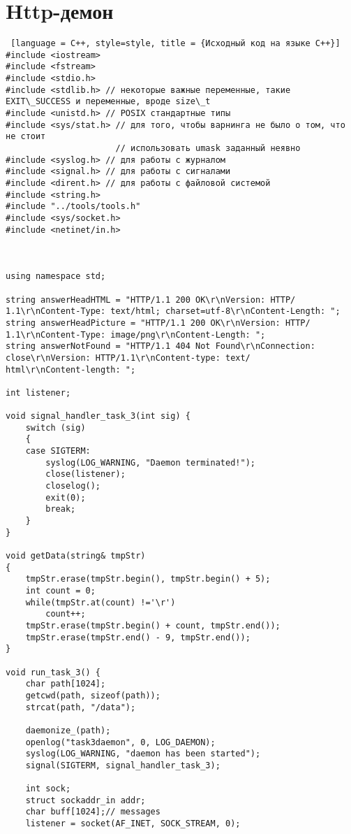 \documentclass{article}
\begin{document}
	\section{Http-демон}

	\begin{lstlisting} [language = C++, style=style, title = {Исходный код на языке C++}]
#include <iostream>
#include <fstream>
#include <stdio.h>
#include <stdlib.h> // некоторые важные переменные, такие EXIT\_SUCCESS и переменные, вроде size\_t
#include <unistd.h> // POSIX стандартные типы
#include <sys/stat.h> // для того, чтобы варнинга не было о том, что не стоит
                      // использовать umask заданный неявно
#include <syslog.h> // для работы с журналом
#include <signal.h> // для работы с сигналами
#include <dirent.h> // для работы с файловой системой
#include <string.h>
#include "../tools/tools.h"
#include <sys/socket.h>
#include <netinet/in.h>



using namespace std;

string answerHeadHTML = "HTTP/1.1 200 OK\r\nVersion: HTTP/
1.1\r\nContent-Type: text/html; charset=utf-8\r\nContent-Length: ";
string answerHeadPicture = "HTTP/1.1 200 OK\r\nVersion: HTTP/
1.1\r\nContent-Type: image/png\r\nContent-Length: ";
string answerNotFound = "HTTP/1.1 404 Not Found\r\nConnection:
close\r\nVersion: HTTP/1.1\r\nContent-type: text/
html\r\nContent-length: ";

int listener;

void signal_handler_task_3(int sig) {
    switch (sig)
    {
    case SIGTERM:
        syslog(LOG_WARNING, "Daemon terminated!");
        close(listener);
        closelog();
        exit(0);
        break;
    }
}

void getData(string& tmpStr)
{
    tmpStr.erase(tmpStr.begin(), tmpStr.begin() + 5);
    int count = 0;
    while(tmpStr.at(count) !='\r')
        count++;
    tmpStr.erase(tmpStr.begin() + count, tmpStr.end());
    tmpStr.erase(tmpStr.end() - 9, tmpStr.end());
}

void run_task_3() {
    char path[1024];
    getcwd(path, sizeof(path));
    strcat(path, "/data");

    daemonize_(path);
    openlog("task3daemon", 0, LOG_DAEMON);
    syslog(LOG_WARNING, "daemon has been started");
    signal(SIGTERM, signal_handler_task_3);

    int sock;
    struct sockaddr_in addr;
    char buff[1024];// messages
    listener = socket(AF_INET, SOCK_STREAM, 0);


\end{lstlisting}
\end{document}
